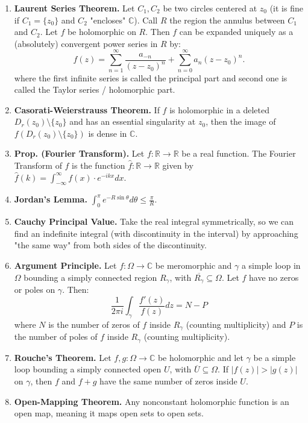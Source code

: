 \documentclass[12pt]{article}
\theoremstyle{definition}
\theoremstyle{named}
\begin{document}
{\begin{multicols}{2}
\begin{spacing}{1.01}
\begin{enumerate}
    \item \textbf{Laurent Series Theorem. } Let $C_1, C_2$ be two circles centered at $z_0$ (it is fine if $C_1 = \{z_0\}$ and $C_2$ "encloses" $\mathbb{C}$). Call $R$ the region the annulus between $C_1$ and $C_2$. Let $f$ be holomorphic on $R$. Then $f$ can be expanded uniquely as a (absolutely) convergent power series in $R$ by: 
    $$
    f(z) = \sum_{n=1}^{\infty} \frac{a_{-n}}{(z-z_0)^n} + \sum_{n=0}^{\infty}a_n(z-z_0)^n. 
    $$ where the first infinite series is called the principal part and second one is called the Taylor series / holomorphic part. 
    \item \textbf{Casorati-Weierstrauss Theorem. } If $f$ is holomorphic in a deleted $D_r(z_0) \setminus \{z_0\}$ and has an essential singularity at $z_0$, then the image of $f\left(D_r(z_0) \setminus \{z_0\}\right)$ is dense in $\mathbb{C}$. 
    \item \textbf{Prop. (Fourier Transform). } Let $f: \mathbb{R} \to \mathbb{R}$ be a real function. The Fourier Transform of $f$ is the function $\hat{f}: \mathbb{R} \to \mathbb{R}$ given by $\hat{f}(k) = \int_{-\infty}^{\infty}f(x) \cdot e^{-ikx} dx$. 
    \item \textbf{Jordan's Lemma. } $\int_{0}^{\pi} e^{-R\sin\theta} d\theta \leq \frac{\pi}{R}$. 
    \item \textbf{Cauchy Principal Value. } Take the real integral symmetrically, so we can find an indefinite integral (with discontinuity in the interval) by approaching "the same way" from both sides of the discontinuity. 
    \item \textbf{Argument Principle. } Let $f: \Omega \to \mathbb{C}$ be meromorphic and $\gamma$ a simple loop in $\Omega$ bounding a simply connected region $R_\gamma$, with $\overline{R_\gamma} \subseteq \Omega$. Let $f$ have no zeros or poles on $\gamma$. Then: 
    $$
    \frac{1}{2\pi i} \int_{\gamma} \frac{f'(z)}{f(z)} dz = N - P
    $$ where $N$ is the number of zeros of $f$ inside $R_\gamma$ (counting multiplicity) and $P$ is the number of poles of $f$ inside $R_\gamma$ (counting multiplicity). 
    \item \textbf{Rouche's Theorem. } Let $f,g: \Omega \to \mathbb{C}$ be holomorphic and let $\gamma$ be a simple loop bounding a simply connected open $U$, with $\overline{U} \subseteq \Omega$. If $|f(z)| > |g(z)|$ on $\gamma$, then $f$ and $f+g$ have the same number of zeros inside $U$. 
    \item \textbf{Open-Mapping Theorem. } Any nonconstant holomorphic function is an open map, meaning it maps open sets to open sets. 

\end{enumerate}
\end{spacing}
\end{multicols}}
\end{document}
